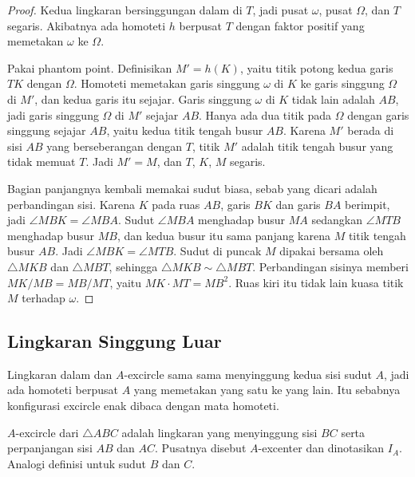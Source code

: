\documentclass[letterpaper, 13pt]{scrartcl}
\begin{document}
\begin{proof}
Kedua lingkaran bersinggungan dalam di $T$, jadi pusat $\omega$, pusat $\Omega$, dan $T$ segaris. Akibatnya ada homoteti $h$ berpusat $T$ dengan faktor positif yang memetakan $\omega$ ke $\Omega$.

Pakai phantom point. Definisikan $M' = h(K)$, yaitu titik potong kedua garis $TK$ dengan $\Omega$. Homoteti memetakan garis singgung $\omega$ di $K$ ke garis singgung $\Omega$ di $M'$, dan kedua garis itu sejajar. Garis singgung $\omega$ di $K$ tidak lain adalah $AB$, jadi garis singgung $\Omega$ di $M'$ sejajar $AB$. Hanya ada dua titik pada $\Omega$ dengan garis singgung sejajar $AB$, yaitu kedua titik tengah busur $AB$. Karena $M'$ berada di sisi $AB$ yang berseberangan dengan $T$, titik $M'$ adalah titik tengah busur yang tidak memuat $T$. Jadi $M' = M$, dan $T$, $K$, $M$ segaris.

Bagian panjangnya kembali memakai sudut biasa, sebab yang dicari adalah perbandingan sisi. Karena $K$ pada ruas $AB$, garis $BK$ dan garis $BA$ berimpit, jadi $\angle MBK = \angle MBA$. Sudut $\angle MBA$ menghadap busur $MA$ sedangkan $\angle MTB$ menghadap busur $MB$, dan kedua busur itu sama panjang karena $M$ titik tengah busur $AB$. Jadi $\angle MBK = \angle MTB$. Sudut di puncak $M$ dipakai bersama oleh $\triangle MKB$ dan $\triangle MBT$, sehingga $\triangle MKB \sim \triangle MBT$. Perbandingan sisinya memberi $MK/MB = MB/MT$, yaitu $MK \cdot MT = MB^2$. Ruas kiri itu tidak lain kuasa titik $M$ terhadap $\omega$.
\end{proof}

\subsection{Lingkaran Singgung Luar}

Lingkaran dalam dan $A$-excircle sama sama menyinggung kedua sisi sudut $A$, jadi ada homoteti berpusat $A$ yang memetakan yang satu ke yang lain. Itu sebabnya konfigurasi excircle enak dibaca dengan mata homoteti.

\begin{definition*}
$A$-excircle dari $\triangle ABC$ adalah lingkaran yang menyinggung sisi $BC$ serta perpanjangan sisi $AB$ dan $AC$. Pusatnya disebut $A$-excenter dan dinotasikan $I_A$. Analogi definisi untuk sudut $B$ dan $C$.
\end{definition*}
\end{document}
